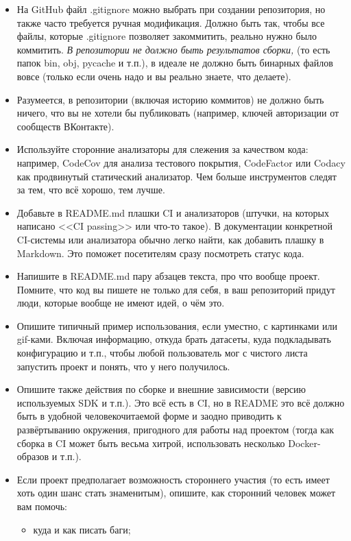 \documentclass[a5paper]{article}
\begin{document}
\begin{itemize}
\begin{itemize}
    \end{itemize}
    \item На GitHub файл .gitignore можно выбрать при создании репозитория, но также часто требуется ручная модификация. Должно быть так, чтобы все файлы, которые .gitignore позволяет закоммитить, реально нужно было коммитить. \emph{В репозитории не должно быть результатов сборки,} (то есть папок bin, obj, pycache и т.п.), в идеале не должно быть бинарных файлов вовсе (только если очень надо и вы реально знаете, что делаете).
    \item Разумеется, в репозитории (включая историю коммитов) не должно быть ничего, что вы не хотели бы публиковать (например, ключей авторизации от сообществ ВКонтакте).
    \item Используйте сторонние анализаторы для слежения за качеством кода: например, CodeCov для анализа тестового покрытия, CodeFactor или Codacy как продвинутый статический анализатор. Чем больше инструментов следят за тем, что всё хорошо, тем лучше.
    \item Добавьте в README.md плашки CI и анализаторов (штучки, на которых написано <<CI passing>> или что-то такое). В документации конкретной CI-системы или анализатора обычно легко найти, как добавить плашку в Markdown. Это поможет посетителям сразу посмотреть статус кода.
    \item Напишите в README.md пару абзацев текста, про что вообще проект. Помните, что код вы пишете не только для себя, в ваш репозиторий придут люди, которые вообще не имеют идей, о чём это.
    \item Опишите типичный пример использования, если уместно, с картинками или gif-ками. Включая информацию, откуда брать датасеты, куда подкладывать конфигурацию и т.п., чтобы любой пользователь мог с чистого листа запустить проект и понять, что у него получилось.
    \item Опишите также действия по сборке и внешние зависимости (версию используемых SDK и т.п.). Это всё есть в CI, но в README это всё должно быть в удобной человекочитаемой форме и заодно приводить к развёртыванию окружения, пригодного для работы над проектом (тогда как сборка в CI может быть весьма хитрой, использовать несколько Docker-образов и т.п.).
    \item Если проект предполагает возможность стороннего участия (то есть имеет хоть один шанс стать знаменитым), опишите, как сторонний человек может вам помочь:
    \begin{itemize}
        \item куда и как писать баги;

\end{itemize}
\end{itemize}
\end{document}
